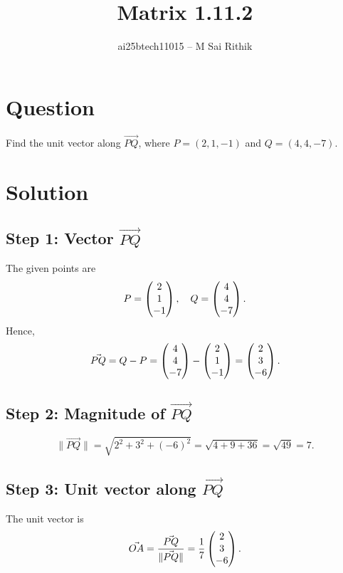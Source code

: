 \documentclass[12pt]{article}
\title{Matrix 1.11.2}
\author{ai25btech11015 -- M Sai Rithik}
\date{}
\begin{document}
\maketitle

\section*{Question}
Find the unit vector along $\Vec{PQ}$, where $P=(2,1,-1)$ and $Q=(4,4,-7)$.  


\section*{Solution}

\subsection*{Step 1: Vector $\Vec{PQ}$}
The given points are
\[
P = \begin{pmatrix}2 \\ 1 \\ -1\end{pmatrix}, 
\quad Q = \begin{pmatrix}4 \\ 4 \\ -7\end{pmatrix}.
\]
Hence,
\begin{equation}
\Vec{PQ} = Q - P = \begin{pmatrix}4 \\ 4 \\ -7\end{pmatrix} - \begin{pmatrix}2 \\ 1 \\ -1\end{pmatrix}
= \begin{pmatrix}2 \\ 3 \\ -6\end{pmatrix}.
\end{equation}

\subsection*{Step 2: Magnitude of $\Vec{PQ}$}
\begin{equation}
\|\Vec{PQ}\| = \sqrt{2^2 + 3^2 + (-6)^2}
= \sqrt{4+9+36}
= \sqrt{49} = 7.
\end{equation}

\subsection*{Step 3: Unit vector along $\Vec{PQ}$}
The unit vector is
\begin{equation}
\Vec{OA} = \frac{\Vec{PQ}}{\|\Vec{PQ}\|}
= \frac{1}{7}\begin{pmatrix}2 \\ 3 \\ -6\end{pmatrix}.
\end{equation}
\end{document}
